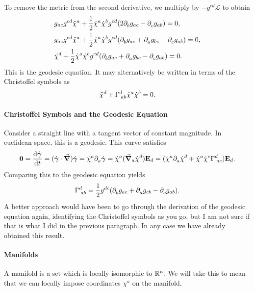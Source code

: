 To remove the metric from the second derivative, we multiply by $-g^{cd}\mathcal{L}$ to obtain
\begin{align*}
	&g_{ac}g^{cd}\ddot{\chi}^{a} + \frac{1}{2}\dot{\chi}^{a}\dot{\chi}^{b}g^{cd}(2\partial^{}_{b}g_{ac} - \partial^{}_{c}g_{ab}) = 0, \\
	&g_{ac}g^{cd}\ddot{\chi}^{a} + \frac{1}{2}\dot{\chi}^{a}\dot{\chi}^{b}g^{cd}(\partial^{}_{b}g_{ac} + \partial^{}_{a}g_{bc} - \partial^{}_{c}g_{ab}) = 0, \\
	&\ddot{\chi}^{d} + \frac{1}{2}\dot{\chi}^{a}\dot{\chi}^{b}g^{cd}(\partial^{}_{b}g_{ac} + \partial^{}_{a}g_{bc} - \partial^{}_{c}g_{ab}) = 0.
\end{align*}
This is the geodesic equation. It may alternatively be written in terms of the Christoffel symbols as
\begin{align*}
	\ddot{\chi}^{d} + \Gamma^{d}_{\;ab}\dot{\chi}^{a}\dot{\chi}^{b} = 0.
\end{align*}

\paragraph{Christoffel Symbols and the Geodesic Equation}
Consider a straight line with a tangent vector of constant magnitude. In euclidean space, this is a geodesic. This curve satisfies
\begin{align*}
	\vb{0} = \dv{\dot{\vb*{\gamma}}}{t} = (\dot{\vb*{\gamma}}\cdot\grad)\dot{\vb*{\gamma}} = \dot{\chi}^{a}\partial^{}_{a}\dot{\vb*{\gamma}} = \dot{\chi}^{a}(\grad_{a}{\dot{\chi}^{d}})\vb{E}_{d} = (\dot{\chi}^{a}\partial^{}_{a}\dot{\chi}^{d} + \dot{\chi}^{a}\dot{\chi}^{c}\Gamma^{d}_{\;ac})\vb{E}_{d}.
\end{align*}
Comparing this to the geodesic equation yields
\begin{align*}
	\Gamma^{d}_{\;ab} = \frac{1}{2}g^{dc}(\partial^{}_{b}g_{ac} + \partial^{}_{a}g_{cb} - \partial^{}_{c}g_{ab}).
\end{align*}
A better approach would have been to go through the derivation of the geodesic equation again, identifying the Christoffel symbols as you go, but I am not sure if that is what I did in the previous paragraph. In any case we have already obtained this result.

\paragraph{Manifolds}
A manifold is a set which is locally isomorphic to $\mathbb{R}^{n}$. We will take this to mean that we can locally impose coordinates $\chi^{a}$ on the manifold.

